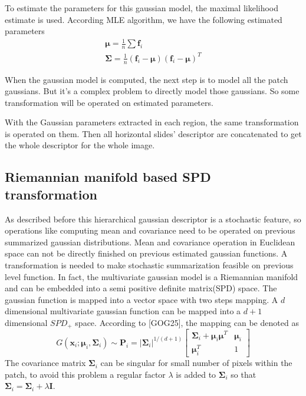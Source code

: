 \documentclass[conference,compsoc]{IEEEtran}
\begin{document}
To estimate the parameters for this gaussian model, the maximal likelihood estimate is used. According MLE algorithm, we have the following estimated parameters
\begin{equation}
\begin{aligned}
\bm{\mu} = \frac{1}{n}\sum \bm{f}_i \\
\bm{\Sigma} = \frac{1}{n} (\bm{f}_i-\bm{\mu})(\bm{f}_i-\bm{\mu})^T
\end{aligned}
\end{equation}

When the gaussian model is computed, the next step is to model all the patch gaussians. But it's a complex problem to directly model those gaussians. So some transformation will be operated on estimated parameters.

With the Gaussian parameters extracted in each region, the same transformation is operated on them. Then all horizontal slides' descriptor are concatenated to get the whole descriptor for the whole image.

\subsection{Riemannian manifold based SPD transformation}

As described before this hierarchical gaussian descriptor is a stochastic feature, so operations like computing mean and covariance need to be operated on previous summarized gaussian distributions. Mean and covariance operation in Euclidean space can not be directly finished on previous estimated gaussian functions. A transformation is needed to make stochastic summarization feasible on previous level function.
In fact, the multivariate gaussian model is a Riemannian manifold and can be embedded into a semi positive definite matrix(SPD) space. The gaussian function is mapped into a vector space with two steps mapping. A $d$ dimensional multivariate gaussian function can be mapped into a $d+1$ dimensional $SPD_+$ space. According to [GOG25], the mapping can be denoted as 
\begin{equation}
G(\bm{x}_i;\bm{\mu}_i,\bm{\Sigma}_i) \sim \bm{P}_i  = |\bm{\Sigma}_i|^{1/(d+1)} \left[ \begin{matrix}
\bm{\Sigma}_i + \bm{\mu}_i\bm{\mu}^T & \bm{\mu}_i \\
\bm{\mu}_i^T & 1
\end{matrix}
\right]
\end{equation}
The covariance matrix $\bm{\Sigma}_i$ can be singular for small number of pixels within the patch, to avoid this problem a regular factor $\lambda$ is added to $\bm{\Sigma}_i$ so that $\bm{\Sigma}_i = \bm{\Sigma}_i + \lambda\bm{I}$. 
\end{document}
